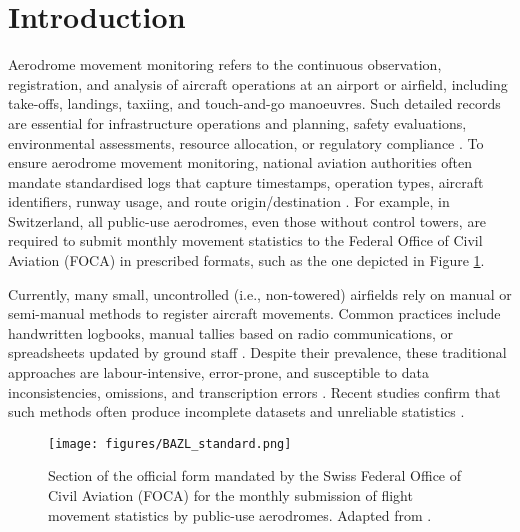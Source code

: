 \documentclass[
  manuscript=proceedings,  %
  layout=preprint,         %
  year=2025,
  volume=x,
]{extra/joas}
\begin{document}
\section{Introduction}
Aerodrome movement monitoring refers to the continuous observation, registration, and analysis of aircraft operations at an airport or airfield, including take-offs, landings, taxiing, and touch-and-go manoeuvres. Such detailed records are essential for infrastructure operations and planning, safety evaluations, environmental assessments, resource allocation, or regulatory compliance \cite{farhadmanesh_aircraft_2025}. To ensure aerodrome movement monitoring, national aviation authorities often mandate standardised logs that capture timestamps, operation types, aircraft identifiers, runway usage, and route origin/destination \cite{fala_adsb}. For example, in Switzerland, all public-use aerodromes, even those without control towers, are required to submit monthly movement statistics to the Federal Office of Civil Aviation (FOCA) in prescribed formats, such as the one depicted in Figure \ref{fig:standar_BAZL_format}.

Currently, many small, uncontrolled (i.e., non-towered) airfields rely on manual or semi-manual methods to register aircraft movements. Common practices include handwritten logbooks, manual tallies based on radio communications, or spreadsheets updated by ground staff \cite{johnson2015}. Despite their prevalence, these traditional approaches are labour-intensive, error-prone, and susceptible to data inconsistencies, omissions, and transcription errors \cite{fala_adsb,  fala_ml_2023}. Recent studies confirm that such methods often produce incomplete datasets and unreliable statistics \cite{zhang_ga_phase_2022}.

\begin{figure}[ht!]
    \centering
    \texttt{[image: figures/BAZL\_standard.png]}
    \caption{Section of the official form mandated by the Swiss Federal Office of Civil Aviation (FOCA) for the monthly submission of flight movement statistics by public-use aerodromes. Adapted from \textcite{BAZL_reporting_2024}.}
    \label{fig:standar_BAZL_format}
\end{figure}
\end{document}

